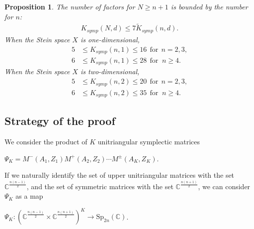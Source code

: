 \documentclass[10pt]{amsart}
\newtheorem{prop}[theo]{Proposition}
\theoremstyle{remark}
\begin{document}
\begin{prop} \label{bounds}
    The number of factors for $N \ge n+1$ is bounded by the number for $n$:
    \begin{align} \label{K(N,d)}
        K_{symp}(N,d) \le 7 \tilde{K}_{symp}(n,d).  
    \end{align}
    When the Stein space $X$ is one-dimensional,
    \begin{align}
        5 &\le K_{symp} (n,1)  \le 16 \ \  \text{for} \ \ n=2,3, \label{K(n,1)n=2,3} \\
   6 &\le K_{symp} (n,1)  \le 28 \ \ \text{for } \  n \ge 4.  \label{K(n,1)n>=4}
    \end{align}
    When the Stein space $X$ is two-dimensional,
    \begin{align}   
   5 &\le K_{symp} (n,2)  \le 20 \ \ \text{for} \ \ n=2,3, \label{K(n,2)n=2,3}\\
   6 &\le   K_{symp}(n,2) \le  35  \ \  \text{for } \ n \ge 4. \label{K(n,2)n>=4}
  \end{align}
\end{prop}


\subsection{Strategy of the proof}
    We consider the product of $K$ unitriangular symplectic matrices
    \begin{center}
    $\Psi_K = M^-(A_1,Z_1) M^+(A_2, Z_2) \cdots  M^{\pm}(A_K, Z_{K})$. 
    \end{center} 
    If we naturally identify the set of upper unitriangular matrices with the set $\mathbb{C}^{\frac{n(n-1)}{2}}$, and the set of symmetric matrices with the set $\mathbb{C}^{\frac{n(n+1)}{2}}$, we can consider $\Psi_K$ as a map
    \begin{center}
    $\Psi_K: (\mathbb{C}^{\frac{n(n-1)}{2}} \times \mathbb{C}^{\frac{n(n+1)}{2}})^K \to \mathrm{Sp}_{2n}(\mathbb{C})$.
    \end{center}
     
    
\end{document}
